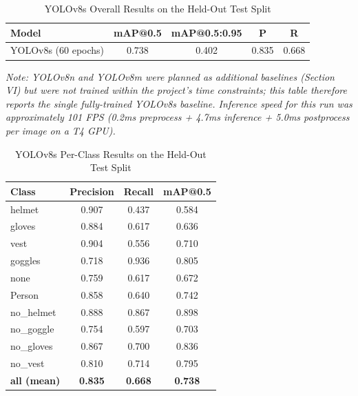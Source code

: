 \documentclass[conference]{IEEEtran}
\begin{document}
\begin{table}[htbp]
\caption{YOLOv8s Overall Results on the Held-Out Test Split}
\begin{center}
\begin{tabular}{lcccc}
\toprule
\textbf{Model} & \textbf{mAP@0.5} & \textbf{mAP@0.5:0.95} & \textbf{P} & \textbf{R} \\
\midrule
YOLOv8s (60 epochs) & 0.738 & 0.402 & 0.835 & 0.668 \\
\bottomrule
\end{tabular}
\label{tab:baseline}
\end{center}
\end{table}
\textit{Note: YOLOv8n and YOLOv8m were planned as additional baselines (Section VI) but were not trained within the project's time constraints; this table therefore reports the single fully-trained YOLOv8s baseline. Inference speed for this run was approximately 101 FPS (0.2ms preprocess + 4.7ms inference + 5.0ms postprocess per image on a T4 GPU).}

\begin{table}[htbp]
\caption{YOLOv8s Per-Class Results on the Held-Out Test Split}
\begin{center}
\begin{tabular}{lccc}
\toprule
\textbf{Class} & \textbf{Precision} & \textbf{Recall} & \textbf{mAP@0.5} \\
\midrule
helmet     & 0.907 & 0.437 & 0.584 \\
gloves     & 0.884 & 0.617 & 0.636 \\
vest       & 0.904 & 0.556 & 0.710 \\
goggles    & 0.718 & 0.936 & 0.805 \\
none       & 0.759 & 0.617 & 0.672 \\
Person     & 0.858 & 0.640 & 0.742 \\
no\_helmet & 0.888 & 0.867 & 0.898 \\
no\_goggle & 0.754 & 0.597 & 0.703 \\
no\_gloves & 0.867 & 0.700 & 0.836 \\
no\_vest   & 0.810 & 0.714 & 0.795 \\
\midrule
\textbf{all (mean)} & \textbf{0.835} & \textbf{0.668} & \textbf{0.738} \\
\bottomrule
\end{tabular}
\label{tab:perclass}
\end{center}
\end{table}
\end{document}
